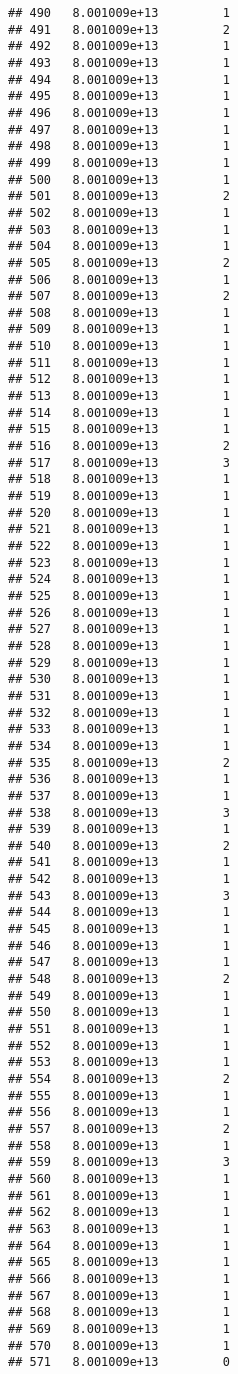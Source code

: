 \documentclass[
]{article}
\begin{document}
\begin{verbatim}
## 490   8.001009e+13         1
## 491   8.001009e+13         2
## 492   8.001009e+13         1
## 493   8.001009e+13         1
## 494   8.001009e+13         1
## 495   8.001009e+13         1
## 496   8.001009e+13         1
## 497   8.001009e+13         1
## 498   8.001009e+13         1
## 499   8.001009e+13         1
## 500   8.001009e+13         1
## 501   8.001009e+13         2
## 502   8.001009e+13         1
## 503   8.001009e+13         1
## 504   8.001009e+13         1
## 505   8.001009e+13         2
## 506   8.001009e+13         1
## 507   8.001009e+13         2
## 508   8.001009e+13         1
## 509   8.001009e+13         1
## 510   8.001009e+13         1
## 511   8.001009e+13         1
## 512   8.001009e+13         1
## 513   8.001009e+13         1
## 514   8.001009e+13         1
## 515   8.001009e+13         1
## 516   8.001009e+13         2
## 517   8.001009e+13         3
## 518   8.001009e+13         1
## 519   8.001009e+13         1
## 520   8.001009e+13         1
## 521   8.001009e+13         1
## 522   8.001009e+13         1
## 523   8.001009e+13         1
## 524   8.001009e+13         1
## 525   8.001009e+13         1
## 526   8.001009e+13         1
## 527   8.001009e+13         1
## 528   8.001009e+13         1
## 529   8.001009e+13         1
## 530   8.001009e+13         1
## 531   8.001009e+13         1
## 532   8.001009e+13         1
## 533   8.001009e+13         1
## 534   8.001009e+13         1
## 535   8.001009e+13         2
## 536   8.001009e+13         1
## 537   8.001009e+13         1
## 538   8.001009e+13         3
## 539   8.001009e+13         1
## 540   8.001009e+13         2
## 541   8.001009e+13         1
## 542   8.001009e+13         1
## 543   8.001009e+13         3
## 544   8.001009e+13         1
## 545   8.001009e+13         1
## 546   8.001009e+13         1
## 547   8.001009e+13         1
## 548   8.001009e+13         2
## 549   8.001009e+13         1
## 550   8.001009e+13         1
## 551   8.001009e+13         1
## 552   8.001009e+13         1
## 553   8.001009e+13         1
## 554   8.001009e+13         2
## 555   8.001009e+13         1
## 556   8.001009e+13         1
## 557   8.001009e+13         2
## 558   8.001009e+13         1
## 559   8.001009e+13         3
## 560   8.001009e+13         1
## 561   8.001009e+13         1
## 562   8.001009e+13         1
## 563   8.001009e+13         1
## 564   8.001009e+13         1
## 565   8.001009e+13         1
## 566   8.001009e+13         1
## 567   8.001009e+13         1
## 568   8.001009e+13         1
## 569   8.001009e+13         1
## 570   8.001009e+13         1
## 571   8.001009e+13         0

\end{verbatim}
\end{document}

